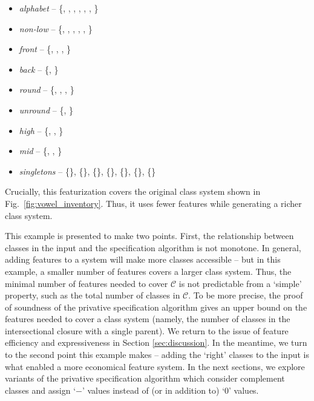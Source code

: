 \documentclass[11pt, oneside]{article}   	%
\begin{document}
 \begin{itemize}
	\item \textit{alphabet} -- \{, , , , \textipa{\oe}, , \} 
	\item \textit{non-low} -- \{, , , , \textipa{\oe}, \} 
    \item \textit{front} -- \{, , , \textipa{\oe}\}
    \item \textit{back} -- \{, \}
    \item \textit{round} -- \{, , \textipa{\oe}, \}
    \item \textit{unround} -- \{, \}
    \item \textit{high} --  \{, , \}
    \item \textit{mid} --  \{, \textipa{\oe}, \}
    \item \textit{singletons} -- \{\}, \{\}, \{\}, \{\}, \{\textipa{\oe}\}, \{\}, \{\}
    \end{itemize}
Crucially, this featurization covers the original class system shown in Fig.~\ref{fig:vowel_inventory}. Thus, it uses fewer features while generating a richer class system.

This example is presented to make two points. First, the relationship between classes in the input and the specification algorithm is not monotone. In general, adding features to a system will make more classes accessible -- but in this example, a smaller number of features covers a larger class system. Thus, the minimal number of features needed to cover $\mathcal C$ is not predictable from a `simple' property, such as the total number of classes in $\mathcal C$. To be more precise, the proof of soundness of the privative specification algorithm gives an upper bound on the features needed to cover a class system (namely, the number of classes in the intersectional closure with a single parent). We return to the issue of feature efficiency and expressiveness in Section \ref{sec:discussion}. In the meantime, we turn to the second point this example makes -- adding the `right' classes to the input is what enabled a more economical feature system. In the next sections, we explore variants of the privative specification algorithm which consider complement classes and assign `$-$' values instead of (or in addition to) `$0$' values. 
\end{document}

